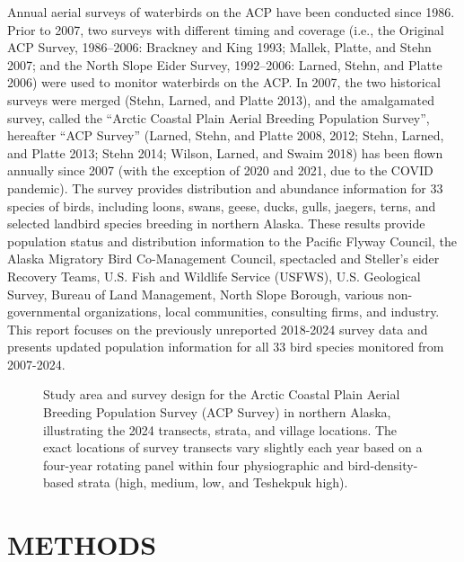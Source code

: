 \documentclass[
]{article}
\makeatletter
\newcommand*\pandocbounded[1]{%
  \sbox\pandoc@box{#1}%
  \Gscale@div\@tempa{\textheight}{\dimexpr\ht\pandoc@box+\dp\pandoc@box\relax}%
  \Gscale@div\@tempb{\linewidth}{\wd\pandoc@box}%
  \ifdim\@tempb\p@<\@tempa\p@\let\@tempa\@tempb\fi%
  \ifdim\@tempa\p@<\p@\scalebox{\@tempa}{\usebox\pandoc@box}%
  \else\usebox{\pandoc@box}%
  \fi%
}
\makeatother
\begin{document}
Annual aerial surveys of waterbirds on the ACP have been conducted since
1986. Prior to 2007, two surveys with different timing and coverage
(i.e., the Original ACP Survey, 1986--2006: Brackney and King 1993;
Mallek, Platte, and Stehn 2007; and the North Slope Eider Survey,
1992--2006: Larned, Stehn, and Platte 2006) were used to monitor
waterbirds on the ACP. In 2007, the two historical surveys were merged
(Stehn, Larned, and Platte 2013), and the amalgamated survey, called the
``Arctic Coastal Plain Aerial Breeding Population Survey'', hereafter
``ACP Survey'' (Larned, Stehn, and Platte 2008, 2012; Stehn, Larned, and
Platte 2013; Stehn 2014; Wilson, Larned, and Swaim 2018) has been flown
annually since 2007 (with the exception of 2020 and 2021, due to the
COVID pandemic). The survey provides distribution and abundance
information for 33 species of birds, including loons, swans, geese,
ducks, gulls, jaegers, terns, and selected landbird species breeding in
northern Alaska. These results provide population status and
distribution information to the Pacific Flyway Council, the Alaska
Migratory Bird Co-Management Council, spectacled and Steller's eider
Recovery Teams, U.S. Fish and Wildlife Service (USFWS), U.S. Geological
Survey, Bureau of Land Management, North Slope Borough, various
non-governmental organizations, local communities, consulting firms, and
industry. This report focuses on the previously unreported 2018-2024
survey data and presents updated population information for all 33 bird
species monitored from 2007-2024.

\begin{figure}

\centering{

\pandocbounded{\texttt{[image: data/fig1.png]}}

}

\caption{\label{fig-Fig1}Study area and survey design for the Arctic
Coastal Plain Aerial Breeding Population Survey (ACP Survey) in northern
Alaska, illustrating the 2024 transects, strata, and village locations.
The exact locations of survey transects vary slightly each year based on
a four-year rotating panel within four physiographic and
bird-density-based strata (high, medium, low, and Teshekpuk high).}

\end{figure}%

\section*{METHODS}\label{methods}
\end{document}

